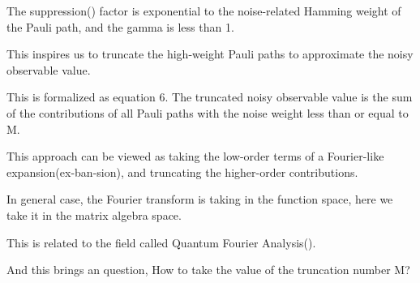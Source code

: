 \documentclass[10pt]{beamer}
\begin{document}
\begin{CJK}{UTF8}{gbsn}
{ The suppression() factor is exponential to the noise-related Hamming weight of the Pauli path, and the gamma is less than 1.


 This inspires us to truncate the high-weight Pauli paths to approximate the noisy observable value. %

 This is formalized as equation 6. The truncated noisy observable value is the sum of the contributions of all Pauli paths with the noise weight less than or equal to M.

 This approach can be viewed as taking the low-order terms of a Fourier-like expansion(ex-ban-sion), and truncating the higher-order contributions.

 In general case, the Fourier transform is taking in the function space, here we take it in the matrix algebra space.

 This is related to the field called Quantum Fourier Analysis(). 

 And this brings an question, How to take the value of the truncation number M?

}

\end{CJK}
\end{document}
